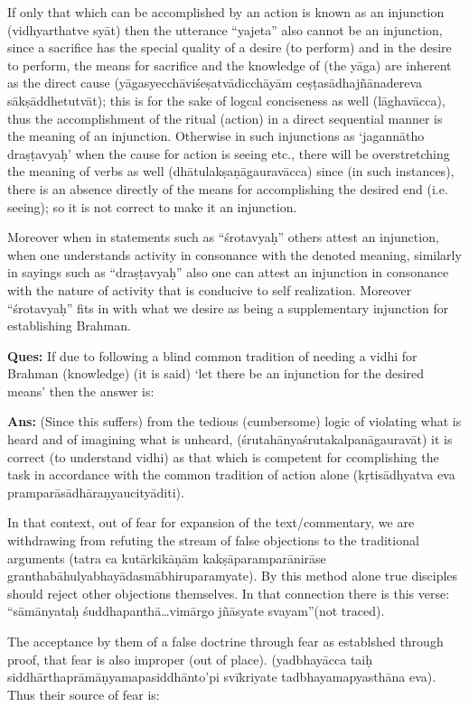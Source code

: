 If only that which can be accomplished by an action is known as an injunction (vidhyarthatve syāt) then the utterance “yajeta” also cannot be an injunction, since a sacrifice has the special quality of a desire (to perform) and in the desire to perform, the means for sacrifice and the knowledge of (the yāga) are inherent as the direct cause (yāgasyecchāviśeṣatvādicchāyām ceṣṭasādhajñānadereva sākṣāddhetutvāt);  this is for the sake of logcal conciseness as well (lāghavācca),  thus the accomplishment of the ritual (action) in a direct sequential manner is the meaning of an injunction. Otherwise in such injunctions as ‘jagannātho draṣṭavyaḥ’ when the cause for action is seeing etc., there will be overstretching the meaning of verbs as well (dhātulakṣaṇāgauravācca) since (in such instances), there is an absence directly of the means for accomplishing the desired end (i.e. seeing); so it is not correct to make it an injunction. 

Moreover when in statements such as “śrotavyaḥ” others attest an injunction, when one understands activity in consonance with the denoted meaning, similarly in sayings such as “draṣṭavyaḥ” also one can attest an injunction in consonance with the nature of activity that is conducive to self realization. Moreover “śrotavyaḥ” fits in with what we desire as being a supplementary injunction for establishing Brahman.

\textbf{Ques:} If due to following a blind common tradition of needing a vidhi for Brahman (knowledge) (it is said) ‘let there be an injunction for the desired means’ then the answer is:

\textbf{Ans:} (Since  this suffers) from the tedious (cumbersome) logic of violating what is heard and of imagining what is unheard, (śrutahānyaśrutakalpanāgauravāt) it is correct  (to understand vidhi) as that which is competent for ccomplishing the task in accordance with the common tradition of action alone (kṛtisādhyatva eva pramparāsādhāraṇyaucityāditi). 

In that context, out of fear for expansion of the text/commentary, we are withdrawing from refuting the stream of false objections to the traditional arguments (tatra ca kutārkikāṇām kakṣāparamparānirāse granthabāhulyabhayādasmābhiruparamyate). By this method alone true disciples should reject other objections themselves. In that connection there is this verse: “sāmānyataḥ śuddhapanthā…vimārgo jñāsyate svayam”(not traced).

The acceptance by them of a false doctrine through fear as establshed through proof, that fear is also improper (out of place). (yadbhayācca taiḥ siddhārthaprāmāṇyamapasiddhānto’pi svīkriyate tadbhayamapyasthāna eva). Thus their source of fear is: 

